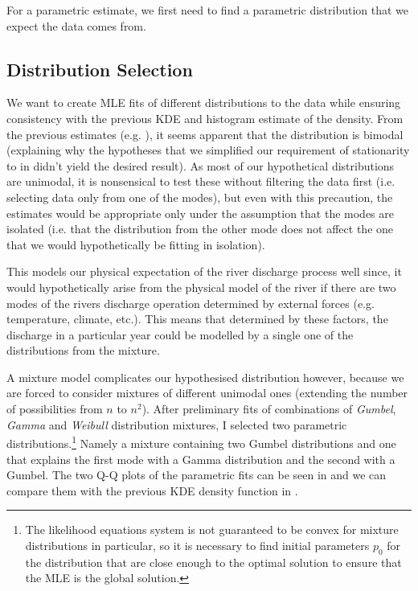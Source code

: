 For a parametric estimate, we first need to find a parametric distribution that we expect the data comes from.

\subsection{Distribution Selection}%
\label{sub:distribution_selection}

We want to create \ac{MLE} fits of different distributions to the data while ensuring consistency with the previous
\ac{KDE} and histogram estimate of the density. From the previous estimates (e.g. ), it seems
apparent that the distribution is bimodal (explaining why the hypotheses that we simplified our requirement of
stationarity to in  didn't yield the desired result). As most of our hypothetical distributions
are unimodal, it is nonsensical to test these without filtering the data first (i.e. selecting data only from one of the
modes), but even with this precaution, the estimates would be appropriate only under the assumption that the modes
are isolated (i.e. that the distribution from the other mode does not affect the one that we would hypothetically be
fitting in isolation).

This models our physical expectation of the river discharge process well since, it would hypothetically arise from the
physical model of the river if there are two modes of the rivers discharge operation determined by external forces (e.g.
temperature, climate, etc.). This means that determined by these factors, the discharge in a particular year could be
modelled by a single one of the distributions from the mixture.

A mixture model complicates our hypothesised distribution however, because we are forced to consider mixtures of
different unimodal ones (extending the number of possibilities from \(n\) to \(n^2\)). After preliminary fits of
combinations of \emph{Gumbel}, \emph{Gamma} and \emph{Weibull} distribution mixtures, I selected two parametric
distributions.\footnote{The likelihood equations system is not guaranteed to be convex for mixture
distributions in particular, so it is necessary to find initial parameters \(p_0\) for the distribution that are
close enough to the optimal solution to ensure that the \ac{MLE} is the global solution.}
Namely a mixture containing two Gumbel distributions and one that explains the first mode with a Gamma distribution and
the second with a Gumbel. The two Q-Q plots of the parametric fits can be seen in  and we
can compare them with the previous \ac{KDE} density function in .


